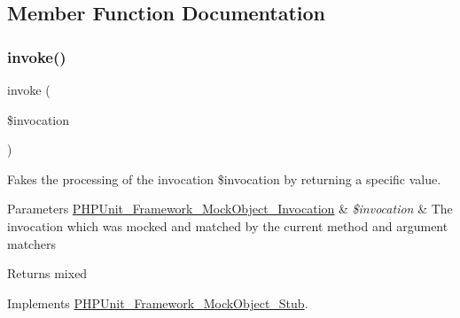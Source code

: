\subsection{Member Function Documentation}
\mbox{\label{class_p_h_p_unit___framework___mock_object___stub___return_self_af2fc26e6704e08d95f2ea1d9c5ffb865}} 
\subsubsection{\texorpdfstring{invoke()}{invoke()}}
{\footnotesize\ttfamily invoke (\begin{DoxyParamCaption}\item[{\mbox{\hyperlink{interface_p_h_p_unit___framework___mock_object___invocation}{P\+H\+P\+Unit\+\_\+\+Framework\+\_\+\+Mock\+Object\+\_\+\+Invocation}}}]{\$invocation }\end{DoxyParamCaption})}

Fakes the processing of the invocation \$invocation by returning a specific value.


\begin{DoxyParams}[1]{Parameters}
\mbox{\hyperlink{interface_p_h_p_unit___framework___mock_object___invocation}{P\+H\+P\+Unit\+\_\+\+Framework\+\_\+\+Mock\+Object\+\_\+\+Invocation}} & {\em \$invocation} & The invocation which was mocked and matched by the current method and argument matchers\\
\hline
\end{DoxyParams}
\begin{DoxyReturn}{Returns}
mixed 
\end{DoxyReturn}


Implements \mbox{\hyperlink{interface_p_h_p_unit___framework___mock_object___stub_af2fc26e6704e08d95f2ea1d9c5ffb865}{P\+H\+P\+Unit\+\_\+\+Framework\+\_\+\+Mock\+Object\+\_\+\+Stub}}.

\mbox{\label{class_p_h_p_unit___framework___mock_object___stub___return_self_a5558c5d549f41597377fa1ea8a1cefa3}} 
